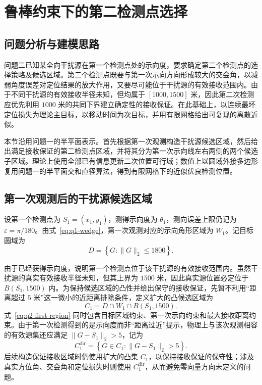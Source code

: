 \section{鲁棒约束下的第二检测点选择}

\subsection{问题分析与建模思路}

问题二已知某全向干扰源在第一个检测点处的示向度，要求确定第二个检测点的选择策略及候选区域。第二个检测点既要与第一次示向方向形成较大的交会角，以减弱角度误差对定位结果的放大作用，又要尽可能位于干扰源的有效接收范围内。由于不同干扰源的有效接收半径未知，但均属于 $[1000,1500]$ 米，因此第二次检测应优先利用 $1000$ 米的共同下界建立确定性的接收保证。在此基础上，以连续最坏定位损失为理论主目标，以移动时间为次目标，并用有限网格给出可复现的离散近似。

本节沿用问题一的半平面表示。首先根据第一次观测构造干扰源候选区域，然后给出满足接收保证的第二检测点区域，并将其分为第一次示向线左右两侧的两个候选子区域。理论上使用全部已有信息更新二次位置可行域；数值上以圆域外接多边形复用问题一的半平面交和直径算法，得到有限网格下的近似优良检测位置。

\subsection{第一次观测后的干扰源候选区域}

设第一个检测点为 $S_1=(x_1,y_1)$，测得示向度为 $\theta_1$，测向误差上限仍记为 $\varepsilon=\pi/180$。由式~\eqref{eq:q1-wedge}，第一次观测对应的示向角形区域为 $W_1$。记目标圆域为
\begin{equation}
  D=\left\{G:\|G\|_2\leq1800\right\}.
  \label{eq:q2-target-disk}
\end{equation}

由于已经获得示向度，说明第一个检测点位于该干扰源的有效接收范围内。虽然干扰源的真实有效接收半径未知，但其上界为 $1500$ 米，因此真实源位置必定位于 $B(S_1,1500)$ 内。为保持候选区域的凸性并给出保守的接收保证，先暂不利用“距离超过 $5$ 米”这一微小的近距离排除条件，定义扩大的凸候选区域为
\begin{equation}
  C_1=D\cap W_1\cap B(S_1,1500).
  \label{eq:q2-first-region}
\end{equation}
式~\eqref{eq:q2-first-region} 同时包含目标区域约束、第一次示向约束和最大接收距离约束。由于第一次检测得到的是示向度而非“距离过近”提示，物理上与该次观测相容的有效源集还应满足 $\|G-S_1\|_2>5$，记为
\[
  C_1^{\mathrm{dir}}
  =\left\{G\in C_1:\|G-S_1\|_2>5\right\}.
\]
后续构造保证接收区域时仍使用扩大的凸集 $C_1$，以保持接收保证的保守性；涉及真实方位角、交会角和定位损失时则使用 $C_1^{\mathrm{dir}}$，从而避免零向量方向未定义的问题。

